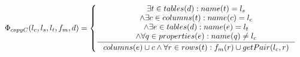 \documentclass[11pt]{article}
\begin{document}
\begin{equation*}
	\begin{gathered}
		\Phi_{copyC}(l_c, l_s, l_t, f_m, d) = \begin{cases}
 		\inference{\exists t \in tables(d) : name(t) = l_s \\ \wedge \exists c \in columns(t) : name(c) = l_c \\ \wedge \exists e \in tables(d) : name(e) = l_t  \\ \wedge \forall q \in properties(e) : name(q) \neq l_c}{columns(e) \cup c \wedge \forall r \in rows(t) : f_m(r) \cup getPair(l_c,r)}
	\end{cases}
	\end{gathered}
\end{equation*}
\end{document}
